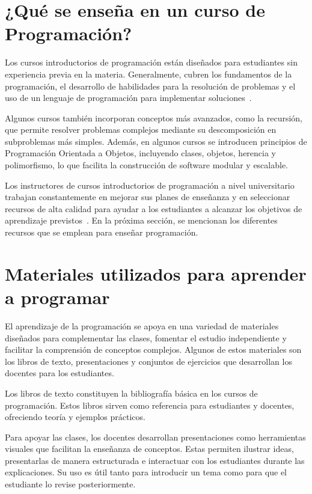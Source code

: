 \documentclass{article}
\begin{document}
\section{¿Qué se enseña en un curso de Programación?}\label{sec:contents}

Los cursos introductorios de programación están diseñados para estudiantes sin experiencia previa en la materia. Generalmente, cubren los fundamentos de la programación, el desarrollo de habilidades para la resolución de problemas y el uso de un lenguaje de programación para implementar soluciones~\cite{Medeiros2019}.

Algunos cursos también incorporan conceptos más avanzados, como la recursión, que permite resolver problemas complejos mediante su descomposición en subproblemas más simples. Además, en algunos cursos se introducen principios de Programación Orientada a Objetos, incluyendo clases, objetos, herencia y polimorfismo, lo que facilita la construcción de software modular y escalable.

Los instructores de cursos introductorios de programación a nivel universitario trabajan constantemente en mejorar sus planes de enseñanza y en seleccionar recursos de alta calidad para ayudar a los estudiantes a alcanzar los objetivos de aprendizaje previstos~\cite{NAS2018}. En la próxima sección, se mencionan los diferentes recursos que se emplean para enseñar programación.

\section{Materiales utilizados para aprender a programar}\label{sec:resources}

El aprendizaje de la programación se apoya en una variedad de materiales diseñados para complementar las clases, fomentar el estudio independiente y facilitar la comprensión de conceptos complejos. Algunos de estos materiales son los libros de texto, presentaciones y conjuntos de ejercicios que desarrollan los docentes para los estudiantes.

Los libros de texto constituyen la bibliografía básica en los cursos de programación. Estos libros sirven como referencia para estudiantes y docentes, ofreciendo teoría y ejemplos prácticos.

Para apoyar las clases, los docentes desarrollan presentaciones como herramientas visuales que facilitan la enseñanza de conceptos. Estas permiten ilustrar ideas, presentarlas de manera estructurada e interactuar con los estudiantes durante las explicaciones. Su uso es útil tanto para introducir un tema como para que el estudiante lo revise posteriormente.  
\end{document}
